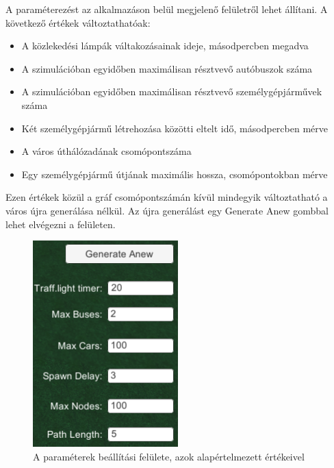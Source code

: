 
A paraméterezést az alkalmazáson belül megjelenő felületről lehet állítani. A következő értékek változtathatóak:
\begin{itemize}
\item{A közlekedési lámpák váltakozásainak ideje, másodpercben megadva}
\item{A szimulációban egyidőben maximálisan résztvevő autóbuszok száma}
\item{A szimulációban egyidőben maximálisan résztvevő személygépjárművek száma}
\item{Két személygépjármű létrehozása közötti eltelt idő, másodpercben mérve}
\item{A város úthálózadának csomópontszáma}
\item{Egy személygépjármű útjának maximális hossza, csomópontokban mérve}
\end{itemize}
Ezen értékek közül a gráf csomópontszámán kívül mindegyik változtatható a város újra generálása nélkül. Az újra generálást egy Generate Anew gombbal lehet elvégezni a felületen.
\begin{figure}[H]
\includegraphics[width=\linewidth]{params.png}
\caption{A paraméterek beállítási felülete, azok alapértelmezett értékeivel}
\label{fig:param}
\end{figure}

